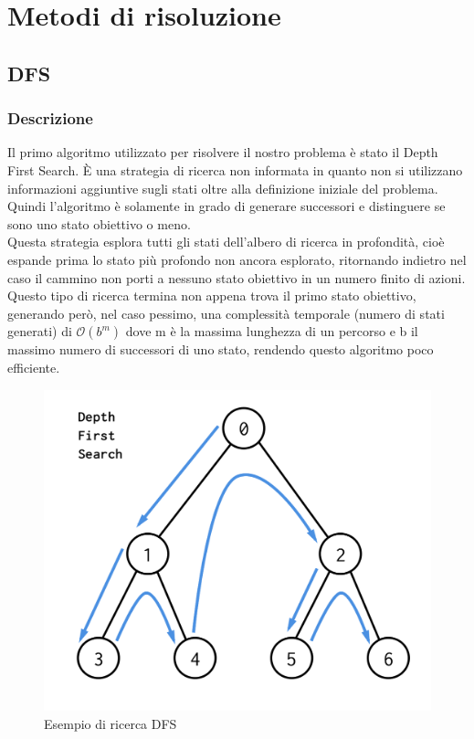 
\chapter{Metodi di risoluzione}
\label{cap:algoritmi}

\section{DFS}
\subsection{Descrizione}
Il primo algoritmo utilizzato per risolvere il nostro problema è stato il Depth First Search. È una strategia di ricerca non informata in quanto non si utilizzano informazioni aggiuntive sugli stati oltre alla definizione iniziale del problema.
Quindi l'algoritmo è solamente in grado di generare successori e distinguere se sono uno stato obiettivo o meno. \\
Questa strategia esplora tutti gli stati dell'albero di ricerca in profondità, cioè espande prima lo stato più profondo non ancora esplorato, ritornando indietro nel caso il cammino non porti a nessuno stato obiettivo in un numero finito di azioni. \\
Questo tipo di ricerca termina non appena trova il primo stato obiettivo, generando però, nel caso pessimo, una complessità temporale (numero di stati generati) di $\mathcal{O}(b^m)$ dove m è la massima lunghezza di un percorso e b il massimo numero di successori di uno stato, rendendo questo algoritmo poco efficiente.
\begin{figure}[h]
	\centering
	\includegraphics[scale=0.25]{immagini/dfs}
	\caption{Esempio di ricerca DFS}
	\label{fig:dfs}
\end{figure}

